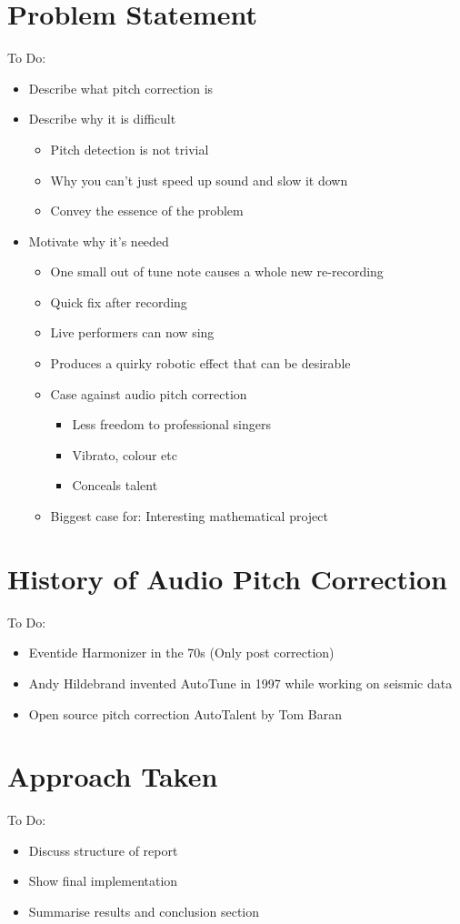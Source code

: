 
\section{Problem Statement}

\color{red}
To Do:
\begin{itemize}
	\item Describe what pitch correction is
	\item Describe why it is difficult
	\begin{itemize}
		\item Pitch detection is not trivial
		\item Why you can't just speed up sound and slow it down
		\item Convey the essence of the problem
	\end{itemize}
		\item Motivate why it's needed
		\begin{itemize}
		\item One small out of tune note causes a whole new re-recording
		\item Quick fix after recording
		\item Live performers can now sing
		\item Produces a quirky robotic effect that can be desirable
		\item Case against audio pitch correction
		\begin{itemize}
			\item Less freedom to professional singers
			\item Vibrato, colour etc
			\item Conceals talent
		\end{itemize}
		\item Biggest case for: Interesting mathematical project
	\end{itemize}
\end{itemize}
\color{black}

\section{History of Audio Pitch Correction}

\color{red}
To Do:
\begin{itemize}
	\item Eventide Harmonizer in the 70s (Only post correction)
	\item Andy Hildebrand invented AutoTune in 1997 while working on seismic data
	\item Open source pitch correction AutoTalent by Tom Baran
\end{itemize}
\color{black}

\section{Approach Taken}

\color{red}
To Do:
\begin{itemize}
	\item Discuss structure of report
	\item Show final implementation
	\item Summarise results and conclusion section
\end{itemize}
\color{black}
